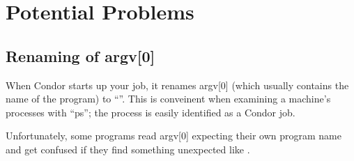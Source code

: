 \section{Potential Problems}

\subsection{Renaming of argv[0]}

When Condor starts up your job, it renames argv[0] (which usually
contains the name of the program) to ``''.  This is
conveinent when examining a machine's processes with ``ps''; the process
is easily identified as a Condor job.  

Unfortunately, some programs read argv[0] expecting their own program
name and get confused if they find something unexpected like
.

